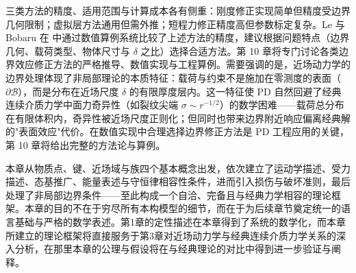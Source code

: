 三类方法的精度、适用范围与计算成本各有侧重：刚度修正实现简单但精度受边界几何限制；虚拟层方法通用但需外推；短程力修正精度高但参数标定复杂。Le 与 Bobaru 在 \cite{LeBobaru2018} 中通过数值算例系统比较了上述方法的精度，建议根据问题特点（边界几何、载荷类型、物体尺寸与 $\delta$ 之比）选择合适方法。第 10 章将专门讨论各类边界效应修正方法的严格推导、数值实现与工程算例。需要强调的是，近场动力学的边界处理体现了非局部理论的本质特征：载荷与约束不是施加在零测度的表面（$\partial\mathcal{B}$），而是分布在近场尺度 $\delta$ 的有限厚度层内。这一特征使 PD 自然回避了经典连续介质力学中面力奇异性（如裂纹尖端 $\sigma\sim r^{-1/2}$）的数学困难——载荷总分布在有限体积内，奇异性被近场尺度正则化；但同时也带来边界附近响应偏离经典解的"表面效应"代价。在数值实现中合理选择边界修正方法是 PD 工程应用的关键，第 10 章将给出完整的方法论与算例。

本章从物质点、键、近场域与族四个基本概念出发，依次建立了运动学描述、受力描述、态基推广、能量表述与守恒律相容性条件，进而引入损伤与破坏准则，最后处理了非局部边界条件——至此构成一个自洽、完备且与经典力学相容的理论框架。本章的目的不在于穷尽所有本构模型的细节，而在于为后续章节奠定统一的语言基础与严格的数学表述。第1章的定性描述在本章得到了系统的数学化，而本章所建立的理论框架将直接服务于第3章对近场动力学与经典连续介质力学关系的深入分析，在那里本章的公理与假设将在与经典理论的对比中得到进一步验证与阐释。

